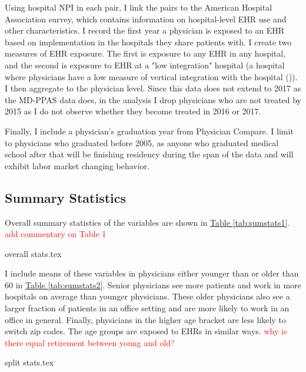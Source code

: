 \documentclass[11pt]{article}
\begin{document}
Using hospital NPI in each pair, I link the pairs to the American Hospital Association survey, which contains information on hospital-level EHR use and other characteristics. I record the first year a physician is exposed to an EHR based on implementation in the hospitals they share patients with. I create two measures of EHR exposure. The first is exposure to any EHR in any hospital, and the second is exposure to EHR at a "low integration" hospital (a hospital where physicians have a low measure of vertical integration with the hospital (\cite{madison2004hospital})). I then aggregate to the physician level. Since this data does not extend to 2017 as the MD-PPAS data does, in the analysis I drop physicians who are not treated by 2015 as I do not observe whether they become treated in 2016 or 2017. 

Finally, I include a physician's graduation year from Physician Compare. I limit to physicians who graduated before 2005, as anyone who graduated medical school after that will be finishing residency during the span of the data and will exhibit labor market changing behavior. 

\subsection{Summary Statistics}

Overall summary statistics of the variables are shown in \hyperref[tab:sumstats1]{Table \ref{tab:sumstats1}}. \textcolor{red}{add commentary on Table 1}

\vspace{5mm}
{overall stats.tex}
\vspace{5mm}

I include means of these variables in physicians either younger than or older than 60 in \hyperref[tab:sumstats2]{Table \ref{tab:sumstats2}}. Senior physicians see more patients and work in more hospitals on average than younger physicians. These older physicians also see a larger fraction of patients in an office setting and are more likely to work in an office in general. Finally, physicians in the higher age bracket are less likely to switch zip codes. The age groups are exposed to EHRs in similar ways. \textcolor{red}{why is there equal retirement between young and old?}


\vspace{5mm}
{split stats.tex}
\vspace{5mm}
\end{document}
